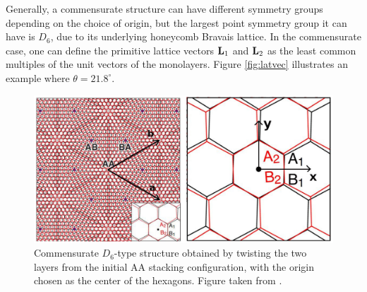 \documentclass[12pt]{report}
\begin{document}
Generally, a commensurate structure can have different symmetry groups depending on the choice of origin, but the largest point symmetry group it can have is $D_6$, due to its underlying honeycomb Bravais lattice. In the commensurate case, one can define the primitive lattice vectors $\vb{L}_1$ and $\vb{L}_2$ as the least common multiples of the unit vectors of the monolayers. Figure \ref{fig:latvec} illustrates an example where $\theta = 21.8^\circ$.
\begin{figure}[H]
\centering
\includegraphics[height=.32\columnwidth]{fig/moireD6.png}
\caption{Commensurate $D_6$-type structure obtained by twisting the two layers from the initial AA stacking configuration, with the origin chosen as the center of the hexagons. Figure taken from \cite{thesis_rennella}.}
\label{fig:moireD6}
\end{figure}
\end{document}
